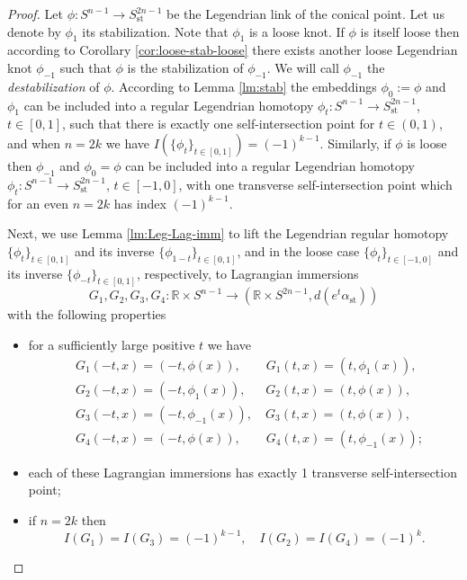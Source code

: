 \documentclass[reqno,11pt]{amsart}
\numberwithin{equation}{section}
\theoremstyle{my}
\theoremstyle{my}
\theoremstyle{your}
\newcommand{\R}{\mathbb{R}}
\newcommand{\st}{\mathrm{st}}
\begin{document}
\begin{proof}
Let $\phi\colon S^{n-1}\to S^{2n-1}_\st$ be the Legendrian link of the conical point. Let us denote by $\phi_1$ its stabilization. Note that $\phi_1$ is a  loose knot. If $\phi$ is itself loose then according to Corollary \ref{cor:loose-stab-loose} there exists   another  loose Legendrian knot
$\phi_{-1}$ such that $\phi$ is the stabilization of $\phi_{-1}$. We will call $\phi_{-1}$ the \emph{destabilization} of $\phi$.
According to  Lemma \ref{lm:stab} the embeddings $\phi_0:=\phi$ and $\phi_1$ can be included into   a regular Legendrian homotopy
$\phi_t\colon S^{n-1}\to S^{2n-1}_\st$, $t\in[0,1]$, such that  there is exactly one self-intersection point  for
$t\in(0,1)$, and  when $n=2k$ we have
$I(\{\phi_t\}_{t\in[0,1]})=(-1)^{k-1}$.
Similarly, if $\phi$ is loose then $\phi_{-1}$ and $\phi_0=\phi$
can be included into   a regular Legendrian homotopy
$\phi_t\colon S^{n-1}\to S^{2n-1}_\st$, $t\in[-1,0]$, with  one transverse  self-intersection point  which for an even    $n=2k$ has index
$(-1)^{k-1}$.

Next, we use Lemma \ref{lm:Leg-Lag-imm} to lift the 
Legendrian regular homotopy
$\{\phi_t\}_{t\in[0,1]}$ and its inverse $\{\phi_{1-t}\}_{t\in[0,1]}$, and in the loose case  $\{\phi_t\}_{t\in[-1,0]}$ and its   inverse 
$  \{\phi_{-t}\}_{t\in[0,1]}$, respectively, to
Lagrangian immersions
$$
G_1,G_2,G_3,G_4\colon \R\times S^{n-1}\to (\R\times S^{2n-1}, d(e^t\alpha_\st))
$$ 
with the following properties
\begin{itemize}
\item for a sufficiently large positive $t$ we have
\begin{align*}
&G_1(-t,x)=(-t,\phi(x)), \quad\quad G_1(t,x)=(t,\phi_1(x)),\\
&G_2(-t,x)=(-t,\phi_1(x)), \quad\;\; G_2(t,x)=(t,\phi(x)),\\
&G_3(-t,x)=(-t,\phi_{-1}(x)), \quad G_3(t,x)=(t,\phi(x)),\\
&G_4(-t,x)=(-t,\phi(x)), \quad\quad G_4(t,x)=(t,\phi_{-1}(x));
\end{align*}
\item each of these Lagrangian immersions has exactly 1 transverse self-intersection point;
\item if $n=2k$ then 
$$
I(G_1)=I(G_3)=(-1)^{k-1}, \quad
I(G_2)=I(G_4)=(-1)^k.
$$
\end{itemize}


\end{proof}
\end{document}
